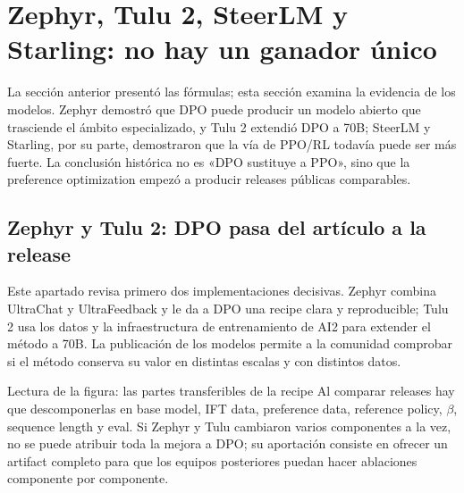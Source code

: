 \section{Zephyr, Tulu 2, SteerLM y Starling: no hay un ganador único}

La sección anterior presentó las fórmulas; esta sección examina la evidencia de los modelos. Zephyr demostró que DPO puede producir un modelo abierto que trasciende el ámbito especializado, y Tulu 2 extendió DPO a 70B; SteerLM y Starling, por su parte, demostraron que la vía de PPO/RL todavía puede ser más fuerte. La conclusión histórica no es «DPO sustituye a PPO», sino que la preference optimization empezó a producir releases públicas comparables.

\subsection{Zephyr y Tulu 2: DPO pasa del artículo a la release}

Este apartado revisa primero dos implementaciones decisivas. Zephyr combina UltraChat y UltraFeedback y le da a DPO una recipe clara y reproducible; Tulu 2 usa los datos y la infraestructura de entrenamiento de AI2 para extender el método a 70B. La publicación de los modelos permite a la comunidad comprobar si el método conserva su valor en distintas escalas y con distintos datos.



\begin{knowledgebox}{Lectura de la figura: las partes transferibles de la recipe}
Al comparar releases hay que descomponerlas en base model, IFT data, preference data, reference policy, $\beta$, sequence length y eval. Si Zephyr y Tulu cambiaron varios componentes a la vez, no se puede atribuir toda la mejora a DPO; su aportación consiste en ofrecer un artifact completo para que los equipos posteriores puedan hacer ablaciones componente por componente.
\end{knowledgebox}


